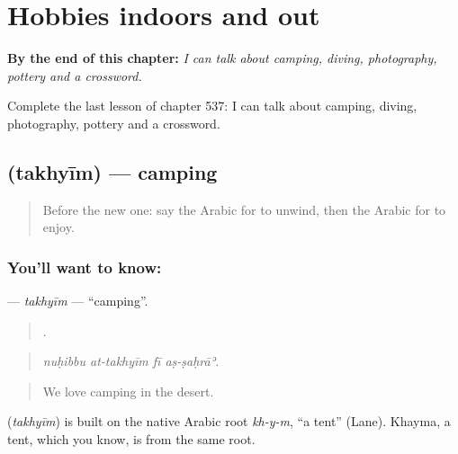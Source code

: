 
\chapter{Hobbies indoors and out}
\label{ch:ar-hobbies-indoors-and-out}

\begin{chapteropening}
\textbf{By the end of this chapter:} \emph{I can talk about camping, diving, photography, pottery and a crossword.}

Complete the last lesson of chapter 537: I can talk about camping, diving, photography, pottery and a crossword.
\end{chapteropening}

\section[\texorpdfstring{\ar{تخييم} (takhyīm)}{تخييم (takhyīm)}]{ (takhyīm) — camping}

\label{lesson:AR-C537-takhyim}



\begin{quote}
Before the new one: say the Arabic for to unwind, then the Arabic for to enjoy.
\end{quote}

\subsection*{You'll want to know: }
\textbf{} — \emph{takhyīm} — \textquotedblleft{}camping\textquotedblright{}.

\begin{quote}
   .
\end{quote}

\begin{quote}
\emph{nuḥibbu at-takhyīm fī aṣ-ṣaḥrāʾ.}
\end{quote}

\begin{quote}
We love camping in the desert.
\end{quote}

\begin{cousinweb}
\textbf{} (\emph{takhyīm}) is built on the native Arabic root \emph{kh-y-m}, \textquotedblleft{}a tent\textquotedblright{} (Lane). Khayma, a tent, which you know, is from the same root.
\end{cousinweb}


